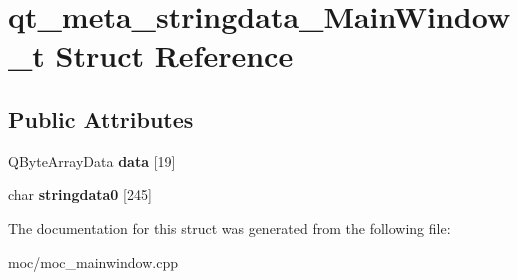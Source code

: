 \hypertarget{structqt__meta__stringdata__MainWindow__t}{\section{qt\-\_\-meta\-\_\-stringdata\-\_\-\-Main\-Window\-\_\-t Struct Reference}
\label{structqt__meta__stringdata__MainWindow__t}
}
\subsection*{Public Attributes}
\begin{DoxyCompactItemize}
\item 
\hypertarget{structqt__meta__stringdata__MainWindow__t_afd67093eee085680898ad79aa678a6fe}{Q\-Byte\-Array\-Data {\bfseries data} \mbox{[}19\mbox{]}}\label{structqt__meta__stringdata__MainWindow__t_afd67093eee085680898ad79aa678a6fe}

\item 
\hypertarget{structqt__meta__stringdata__MainWindow__t_ac66323ffb3afc76c1ebf5d7e96be1b70}{char {\bfseries stringdata0} \mbox{[}245\mbox{]}}\label{structqt__meta__stringdata__MainWindow__t_ac66323ffb3afc76c1ebf5d7e96be1b70}

\end{DoxyCompactItemize}


The documentation for this struct was generated from the following file\-:\begin{DoxyCompactItemize}
\item 
moc/moc\-\_\-mainwindow.\-cpp\end{DoxyCompactItemize}
